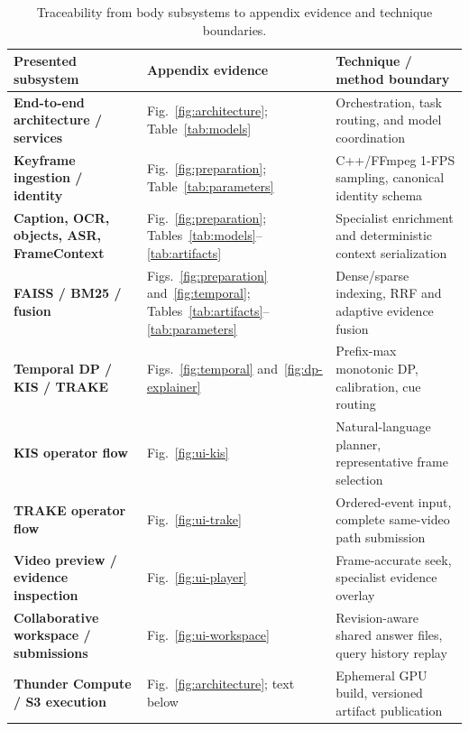 \begin{table}[htbp]
\centering
\caption{Traceability from body subsystems to appendix evidence and
technique boundaries.}
\label{tab:coverage}
\small
\begin{tabularx}{\textwidth}{@{}>{\bfseries}p{}Xp{}@{}}
\toprule
Presented subsystem & Appendix evidence & Technique / method boundary \\
\midrule
End-to-end architecture / services & Fig.~\ref{fig:architecture}; Table~\ref{tab:models} & Orchestration, task routing, and model coordination \\
Keyframe ingestion / identity & Fig.~\ref{fig:preparation}; Table~\ref{tab:parameters} & C++/FFmpeg 1-FPS sampling, canonical identity schema \\
Caption, OCR, objects, ASR, FrameContext & Fig.~\ref{fig:preparation}; Tables~\ref{tab:models}--\ref{tab:artifacts} & Specialist enrichment and deterministic context serialization \\
FAISS / BM25 / fusion & Figs.~\ref{fig:preparation} and~\ref{fig:temporal}; Tables~\ref{tab:artifacts}--\ref{tab:parameters} & Dense/sparse indexing, RRF and adaptive evidence fusion \\
Temporal DP / KIS / TRAKE & Figs.~\ref{fig:temporal} and~\ref{fig:dp-explainer} & Prefix-max monotonic DP, calibration, cue routing \\
KIS operator flow & Fig.~\ref{fig:ui-kis} & Natural-language planner, representative frame selection \\
TRAKE operator flow & Fig.~\ref{fig:ui-trake} & Ordered-event input, complete same-video path submission \\
Video preview / evidence inspection & Fig.~\ref{fig:ui-player} & Frame-accurate seek, specialist evidence overlay \\
Collaborative workspace / submissions & Fig.~\ref{fig:ui-workspace} & Revision-aware shared answer files, query history replay \\
Thunder Compute / S3 execution & Fig.~\ref{fig:architecture}; text below & Ephemeral GPU build, versioned artifact publication \\
\bottomrule
\end{tabularx}
\end{table}


